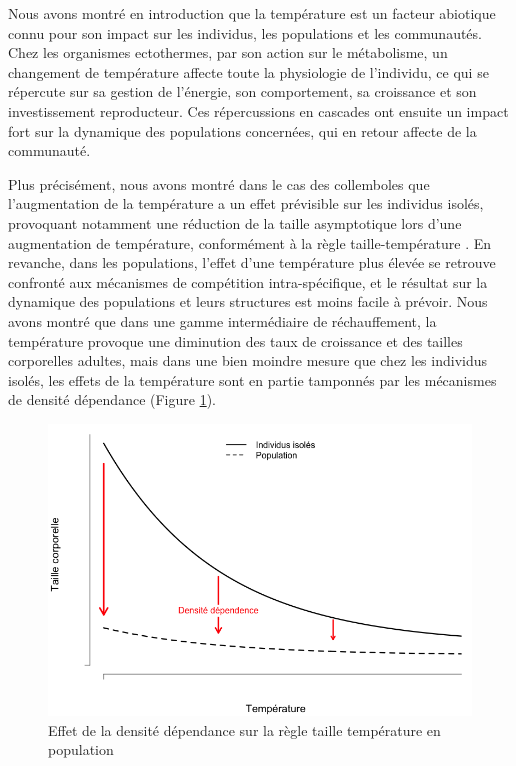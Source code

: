 Nous avons montré en introduction que la température est un facteur abiotique
connu pour son impact sur les individus, les populations et les communautés.
Chez les organismes ectothermes, par son action sur le métabolisme, un
changement de température affecte toute la physiologie de l'individu, ce qui se
répercute sur sa gestion de l'énergie, son comportement, sa croissance et son
investissement reproducteur. Ces répercussions en cascades ont ensuite un impact
fort sur la dynamique des populations concernées, qui en retour affecte de la communauté.

Plus précisément, nous avons montré dans le cas des collemboles que
l'augmentation de la température a un effet prévisible sur les individus isolés,
provoquant notamment une réduction de la taille asymptotique lors d'une
augmentation de température, conformément à la règle taille-température
\autocites{angilletta2009a}. En revanche, dans les populations, l'effet d'une
température plus élevée se retrouve confronté aux mécanismes de compétition
intra-spécifique, et le résultat sur la dynamique des populations et leurs
structures est moins facile à prévoir. Nous avons montré que dans une gamme
intermédiaire de réchauffement, la température provoque une diminution des taux
de croissance et des tailles corporelles adultes, mais dans une bien moindre
mesure que chez les individus isolés, les effets de la température sont en
partie tamponnés par les mécanismes de densité dépendance (Figure
\ref{fig:Concl1}).

\begin{figure}[!ht]
\begin{center}
\includegraphics[width=1\textwidth]{Conclu/TempSizeRule}
\caption[Règle Taille-Température en
population]{Effet de la densité dépendance sur la règle taille température en
population}
\label{fig:Concl1}
\end{center}
\end{figure}

